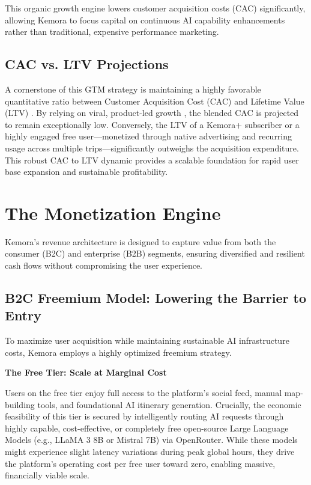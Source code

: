 This organic growth engine lowers customer acquisition costs (CAC) significantly, allowing Kemora to focus capital on continuous AI capability enhancements rather than traditional, expensive performance marketing. 

\subsection{CAC vs. LTV Projections}
A cornerstone of this GTM strategy is maintaining a highly favorable quantitative ratio between Customer Acquisition Cost (CAC) and Lifetime Value (LTV) \cite{cac_ltv_metrics}. By relying on viral, product-led growth \cite{plg_strategy}, the blended CAC is projected to remain exceptionally low. Conversely, the LTV of a Kemora+ subscriber or a highly engaged free user—monetized through native advertising and recurring usage across multiple trips—significantly outweighs the acquisition expenditure. This robust CAC to LTV dynamic provides a scalable foundation for rapid user base expansion and sustainable profitability.

\section{The Monetization Engine}
Kemora's revenue architecture is designed to capture value from both the consumer (B2C) and enterprise (B2B) segments, ensuring diversified and resilient cash flows without compromising the user experience.

\subsection{B2C Freemium Model: Lowering the Barrier to Entry}
To maximize user acquisition while maintaining sustainable AI infrastructure costs, Kemora employs a highly optimized freemium strategy.

\textbf{The Free Tier: Scale at Marginal Cost}

Users on the free tier enjoy full access to the platform's social feed, manual map-building tools, and foundational AI itinerary generation. Crucially, the economic feasibility of this tier is secured by intelligently routing AI requests through highly capable, cost-effective, or completely free open-source Large Language Models (e.g., LLaMA 3 8B or Mistral 7B) via OpenRouter. While these models might experience slight latency variations during peak global hours, they drive the platform's operating cost per free user toward zero, enabling massive, financially viable scale.


